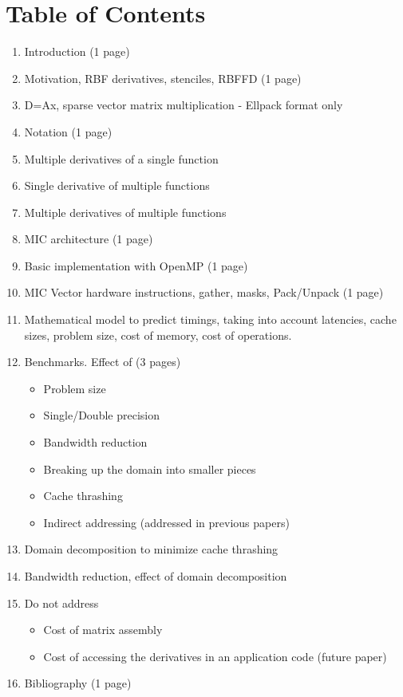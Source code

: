 \section{Table of Contents}
\begin{enumerate}
\item Introduction (1 page) 
\item Motivation, RBF derivatives, stenciles, RBFFD  (1 page)
\item D=Ax, sparse vector matrix  multiplication
  - Ellpack format only
\item Notation (1 page)
\item Multiple derivatives of a single function
\item Single derivative of multiple functions
\item Multiple derivatives of multiple functions
\item MIC architecture (1 page)
\item Basic implementation with OpenMP (1 page)
\item MIC Vector hardware instructions, gather, masks, Pack/Unpack
  (1 page)
\item Mathematical model to predict timings, taking into account latencies, 
   cache sizes, problem size, cost of memory, cost of operations. 
\item Benchmarks. Effect of (3 pages)
\begin{itemize}
 \item Problem size
 \item Single/Double precision
 \item Bandwidth reduction
 \item Breaking up the domain into smaller pieces 
 \item Cache thrashing
 \item Indirect addressing (addressed in previous papers)
\end{itemize}
\item Domain decomposition to minimize cache thrashing
\item Bandwidth reduction, effect of domain decomposition
\item Do not address
\begin{itemize}
  \item Cost of matrix assembly
  \item Cost of accessing the derivatives in an application code (future paper)
\end{itemize}
\item Bibliography (1 page)
\end{enumerate}
